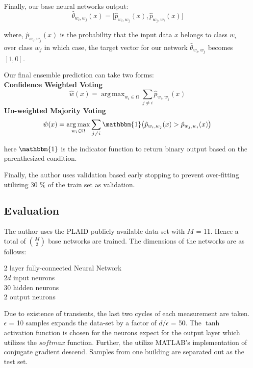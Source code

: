 \documentclass[11pt, a4paper]{article} %
\DeclareMathOperator*{\argmax}{arg\,max}
\begin{document}
Finally, our base neural networks output: 
\[\hat{\theta}_{w_i,w_j}(x) = \big[ \hat{p}_{w_i,w_j}(x),\hat{p}_{w_j,w_i}(x)\big]\]

where, $\hat{p}_{w_i,w_j}(x)$ is the probability that the input data $x$ belongs to class $w_i$ over class $w_j$ in which case, the target vector for our network $\hat{\theta}_{w_i,w_j}$ becomes $[1,0]$.

Our final ensemble prediction can take two forms:\\
\textbf{Confidence Weighted Voting}
\[\hat{w}(x) = \argmax_{w_i \in \Omega} \sum_{j \neq i} \hat{p}_{w_i,w_j}(x)\]
\textbf{Un-weighted Majority Voting}
\[\hat{w}(x) = \argmax_{w_i \in \Omega} \sum_{j \neq i} \mathbbm{1} \big( \hat{p}_{w_i,w_j}(x) > \hat{p}_{w_j,w_i}(x) \big)\]

here $\mathbbm{1}$ is the indicator function to return binary output based on the parenthesized condition.

Finally, the author uses validation based early stopping to prevent over-fitting utilizing 30 \% of the train set as validation. 

\subsection{Evaluation}
The author uses the PLAID publicly available data-set with $M$ = 11. Hence a total of $M \choose 2$ base networks are trained. The dimensions of the networks are as follows: \newline
\begin{center}
2 layer fully-connected Neural Network \\
    $2d$ input neurons \\
    $30$ hidden neurons \\
    $2$ output neurons \\
\end{center}

Due to existence of transients, the last two cycles of each measurement are taken. $\epsilon$ = 10 samples expands the data-set by a factor of $d/\epsilon$ = 50. The $\tanh$ activation function is chosen for the neurons expect for the output layer which utilizes the $softmax$ function. Further, the utilize MATLAB's implementation of conjugate gradient descend. Samples from one building are separated out as the test set.



\end{document}
